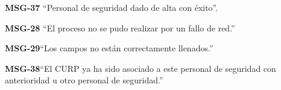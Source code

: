 \begin{Citemize}
    \item {\bf MSG-37} ``Personal de seguridad dado de alta con éxito''.
    \item {\bf MSG-28}  ``El proceso no se pudo realizar por un fallo de red.''
    \item {\bf MSG-29}{``Los campos no están correctamente llenados.''}
    \item {\bf MSG-38}{``El CURP ya ha sido asociado a este personal de seguridad con anterioridad u otro personal de seguridad.''}
    
\end{Citemize}
